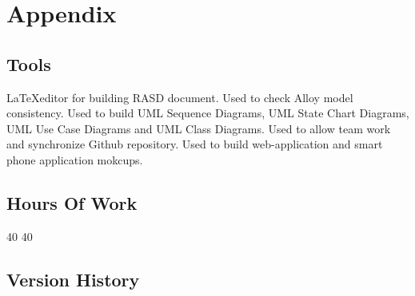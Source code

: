 \section{Appendix}
\subsection{Tools}
\begin{itemize}
	 \LaTeX editor for building RASD document.
	 Used to check Alloy model consistency.
	 Used to build UML Sequence Diagrams, UML State Chart Diagrams, UML Use Case Diagrams and UML Class Diagrams.
	 Used to allow team work and synchronize Github repository.
	 Used to build web-application and smart phone application mokcups.
\end{itemize}
\subsection{Hours Of Work}
\begin{itemize}
	 40
	 40
\end{itemize}
\subsection{Version History}
